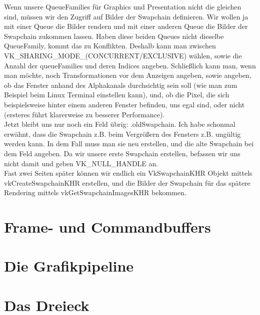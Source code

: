 \documentclass[11pt,a4paper]{report}
\begin{document}
Wenn unsere QueueFamilies für Graphics und Presentation nicht die gleichen sind, müssen wir den Zugriff auf Bilder der Swapchain definieren. Wir wollen ja mit einer Queue die Bilder rendern und mit einer anderen Queue die Bilder der Swapchain zukommen lassen. Haben diese beiden Queues nicht dieselbe QueueFamily, kommt das zu Konflikten. Deshalb kann man zwischen VK\_SHARING\_MODE\_(CONCURRENT/EXCLUSIVE) wählen, sowie die Anzahl der queueFamilies und deren Indices angeben. Schließlich kann man, wenn man möchte, noch Transformationen vor dem Anzeigen angeben, sowie angeben, ob das Fenster anhand des Alphakanals durchsichtig sein soll (wie man zum Beispiel beim Linux Terminal einstellen kann), und, ob die Pixel, die sich beispielsweise hinter einem anderen Fenster befinden, uns egal sind, oder nicht (ersteres führt klarerweise zu besserer Performance).\\
Jetzt bleibt uns nur noch ein Feld übrig: .oldSwapchain. Ich habe schonmal erwähnt, dass die Swapchain z.B. beim Vergrößern des Fensters z.B. ungültig werden kann. In dem Fall muss man sie neu erstellen, und die alte Swapchain bei dem Feld angeben. Da wir unsere erste Swapchain erstellen, befassen wir uns nicht damit und geben VK\_NULL\_HANDLE an.\\
Fast zwei Seiten später können wir endlich ein VkSwapchainKHR Objekt mittels vkCreateSwapchainKHR erstellen, und die Bilder der Swapchain für das spätere Rendering mittels vkGetSwapchainImagesKHR bekommen.

\chapter{Frame- und Commandbuffers}
\chapter{Die Grafikpipeline}
\chapter{Das Dreieck}
\end{document}
